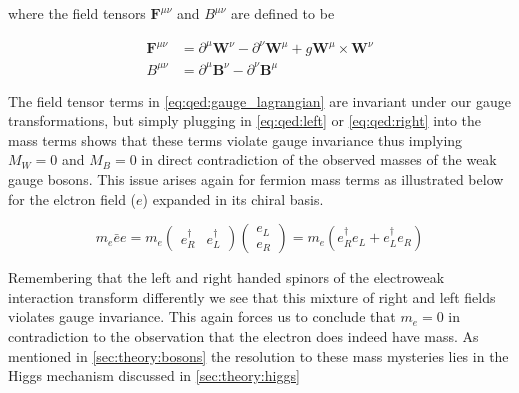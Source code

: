 where the field tensors $\boldsymbol{F}^{\mu\nu}$ and $B^{\mu\nu}$ are defined
to be

\begin{align}
\boldsymbol{F}^{\mu\nu}  &= \partial^{\mu}\boldsymbol{W}^{\nu} -
\partial^{\nu}\boldsymbol{W}^{\mu} + g\boldsymbol{W}^{\mu} \times
\boldsymbol{W}^{\nu} \\
B^{\mu\nu} &=  \partial^{\mu}\boldsymbol{B}^{\nu} -
\partial^{\nu}\boldsymbol{B}^{\mu}
\end{align}

The field tensor terms in \cref{eq:qed:gauge_lagrangian} are invariant
under our gauge transformations, but simply plugging in
\cref{eq:qed:left} or \cref{eq:qed:right} into the mass terms shows that
these terms violate gauge invariance thus implying $M_{W} = 0$ and $M_{B} = 0$
in direct contradiction of the observed masses of the weak gauge bosons.  This
issue arises again for fermion mass terms as illustrated below for the elctron
field ($e$) expanded in its chiral basis.

\begin{equation}
m_{e}\bar{e}e = m_{e} \left( \begin{matrix}e^{\dagger}_{R} &
e^{\dagger}_{L} \end{matrix} \right) \left( \begin{matrix} e_{L}
\\ e_{R} \end{matrix} \right) = m_{e}(e^{\dagger}_{R}e_{L} +
e^{\dagger}_{L}e_{R})
\end{equation}

Remembering that the left and right handed spinors of the electroweak
interaction transform differently we see that this mixture of right and left
fields violates gauge invariance. This again forces us to conclude that $m_{e} = 0$
in contradiction to the observation that the electron does indeed have mass. As
mentioned in \cref{sec:theory:bosons} the resolution to these mass
mysteries lies in the Higgs mechanism discussed in
\cref{sec:theory:higgs}
